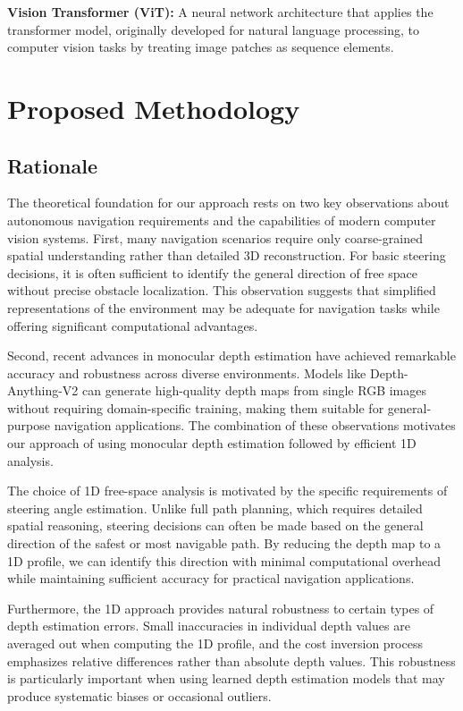 \documentclass[conference]{IEEEtran}
\begin{document}
\textbf{Vision Transformer (ViT):} A neural network architecture that applies the transformer model, originally developed for natural language processing, to computer vision tasks by treating image patches as sequence elements.

\section{Proposed Methodology}

\subsection{Rationale}
The theoretical foundation for our approach rests on two key observations about autonomous navigation requirements and the capabilities of modern computer vision systems. First, many navigation scenarios require only coarse-grained spatial understanding rather than detailed 3D reconstruction. For basic steering decisions, it is often sufficient to identify the general direction of free space without precise obstacle localization. This observation suggests that simplified representations of the environment may be adequate for navigation tasks while offering significant computational advantages.

Second, recent advances in monocular depth estimation have achieved remarkable accuracy and robustness across diverse environments. Models like Depth-Anything-V2 can generate high-quality depth maps from single RGB images without requiring domain-specific training, making them suitable for general-purpose navigation applications. The combination of these observations motivates our approach of using monocular depth estimation followed by efficient 1D analysis.

The choice of 1D free-space analysis is motivated by the specific requirements of steering angle estimation. Unlike full path planning, which requires detailed spatial reasoning, steering decisions can often be made based on the general direction of the safest or most navigable path. By reducing the depth map to a 1D profile, we can identify this direction with minimal computational overhead while maintaining sufficient accuracy for practical navigation applications.

Furthermore, the 1D approach provides natural robustness to certain types of depth estimation errors. Small inaccuracies in individual depth values are averaged out when computing the 1D profile, and the cost inversion process emphasizes relative differences rather than absolute depth values. This robustness is particularly important when using learned depth estimation models that may produce systematic biases or occasional outliers.
\end{document}

